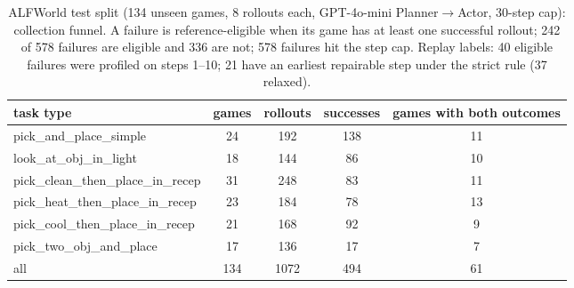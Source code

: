 \begin{table}[!t]
\caption{ALFWorld test split (134 unseen games, 8 rollouts each, GPT-4o-mini Planner$\to$Actor, 30-step cap): collection funnel. A failure is reference-eligible when its game has at least one successful rollout; 242 of 578 failures are eligible and 336 are not; 578 failures hit the step cap. Replay labels: 40 eligible failures were profiled on steps 1--10; 21 have an earliest repairable step under the strict rule (37 relaxed).}
\label{tab:alf-funnel}
\centering\scriptsize
\begin{tabular}{lcccc}
\toprule
task type & games & rollouts & successes & games with both outcomes \\
\midrule
pick\_and\_place\_simple & 24 & 192 & 138 & 11 \\
look\_at\_obj\_in\_light & 18 & 144 & 86 & 10 \\
pick\_clean\_then\_place\_in\_recep & 31 & 248 & 83 & 11 \\
pick\_heat\_then\_place\_in\_recep & 23 & 184 & 78 & 13 \\
pick\_cool\_then\_place\_in\_recep & 21 & 168 & 92 & 9 \\
pick\_two\_obj\_and\_place & 17 & 136 & 17 & 7 \\
\midrule
all & 134 & 1072 & 494 & 61 \\
\bottomrule
\end{tabular}
\end{table}
